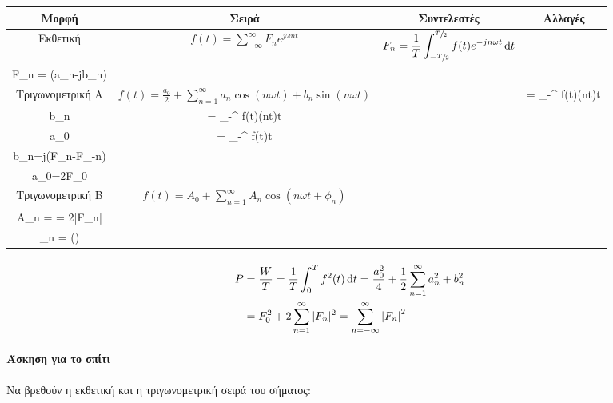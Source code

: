 \documentclass[11pt,a4paper,titlepage,fleqn]{article}
\begin{document}
	\hspace{-2cm}
	\begin{tabular}{|c|c|c|c|}
		\hline \textbf{Μορφή} & \textbf{Σειρά}  & \textbf{Συντελεστές} & \textbf{Αλλαγές} \\ 
		\hline Εκθετική & \(\displaystyle f(t)=\sum_{-\infty}^\infty F_n e^{j\omega n t} \) &
		\(\displaystyle F_n = \frac{1}{T} \int_{-\sfrac{T}{2}}^{\sfrac{T}{2}}
		f(t)e^{-jn\omega t}\dif t\) &\(
		\begin{array}{l}
			F_0 = \sfrac{a_0}{2} \\ F_n = \sfrac{1}{2} (a_n-jb_n)  
		\end{array}\)
		 \\ 
		\hline {\small Τριγωνομετρική} Α  & \( 
		\displaystyle f(t)=\frac{a_0}{2}+\sum_{n=1}^\infty a_n\cos(n\omega t)
		+b_n\sin(n\omega t)
		 \)  & \(
		 \begin{array}{ll}
		 a_n &= \frac{2}{T} \int_{-\sfrac{T}{2}}^{\sfrac{T}{2}} f(t)\cos(n\omega t)\dif t \\
		 b_n &= \frac{2}{T} \int_{-\sfrac{T}{2}}^{\sfrac{T}{2}} f(t)\sin(n\omega t)\dif t \\ a_0 &= \frac{2}{T} \int_{-\sfrac{T}{2}}^{\sfrac{T}{2}} f(t)\dif t
		 \end{array}
		 \) & 
		 \(
		 \begin{array}{l}
		 a_n = (F_n+F_{-n})\\
		 b_n=j(F_n-F_{-n})\\
		 a_0=2F_0
		 \end{array}
		 \)
		 \\ 
		\hline 
		{\small Τριγωνομετρική} Β
		& \(
		f(t) = A_0 + \sum_{n=1}^\infty A_n\cos(n\omega t+\phi_n)
		\) & &
		\(
		\begin{array}{l}
		A_0 = \sfrac{a_0}{2} \\
		A_n = \sqrt{a_n^2+b_n^2} = 2|F_n| \\
		\phi_n = \arctan\left(\frac{b_n}{a_n}\right)
		\end{array}
		\)
		\\ \hline
	\end{tabular} 
	
	\paragraph{}
	\begin{align*}
	P &= \frac{W}{T} = \frac{1}{T} \int_0^T f^2(t)\dif t =	
	\frac{a_0^2}{4}+\frac{1}{2}\sum_{n=1}^\infty a_n^2+b_n^2
	\\ &= F_0^2+2\sum_{n=1}^\infty |F_n|^2 = 
	\sum_{n=-\infty}^\infty \left|F_n\right|^2 
	\end{align*}
	
	\paragraph{Άσκηση για το σπίτι}
	Να βρεθούν η εκθετική και η τριγωνομετρική σειρά του σήματος:
    
\end{document}
